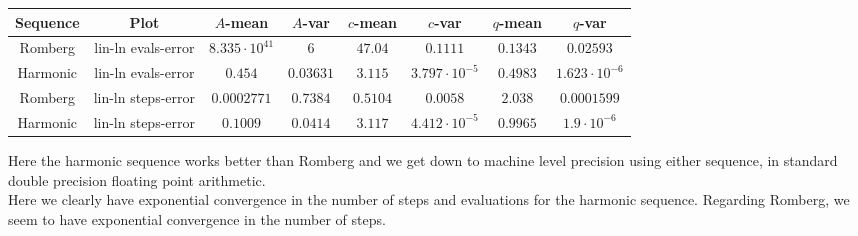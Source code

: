 \begin{table}[H]
    \centering
    \small
     \begin{tabular}{c|c||c|c|c|c|c|c}
Sequence & Plot & \(A\)-mean & \(A\)-var & \(c\)-mean & \(c\)-var & \(q\)-mean & \(q\)-var\\\hline
\rowcolor{red}
Romberg & lin-ln evals-error & \(8.335\cdot 10^{41}\) & \(6\) & \(47.04\) & \(0.1111\) & \(0.1343\) & \(0.02593\) \\
\rowcolor{green}
Harmonic & lin-ln evals-error & \(0.454\) & \(0.03631\) & \(3.115\) & \(3.797\cdot 10^{-5}\) & \(0.4983\) & \(1.623\cdot 10^{-6}\) \\
\rowcolor{green}
Romberg & lin-ln steps-error & \(0.0002771\) & \(0.7384\) & \(0.5104\) & \(0.0058\) & \(2.038\) & \(0.0001599\) \\
\rowcolor{green}
Harmonic & lin-ln steps-error & \(0.1009\) & \(0.0414\) & \(3.117\) & \(4.412\cdot 10^{-5}\) & \(0.9965\) & \(1.9\cdot 10^{-6}\) \\
    \end{tabular}
    \label{tab:my_label}
\end{table}

Here the harmonic sequence works better than Romberg and we get down to machine level precision using either sequence, in standard double precision floating point arithmetic.\\

Here we clearly have exponential convergence in the number of steps and evaluations for the harmonic sequence. Regarding Romberg, we seem to have exponential convergence in the number of steps.

